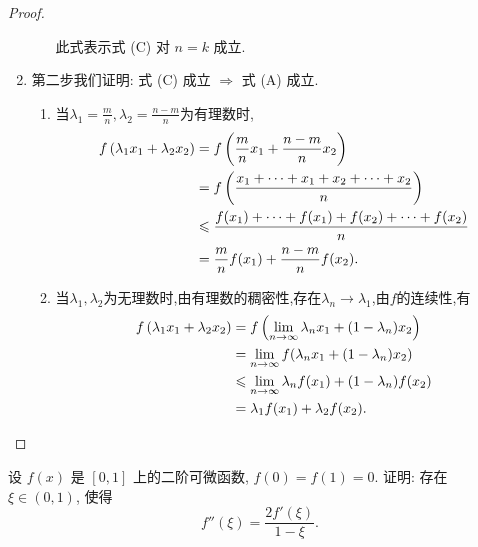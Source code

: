 \begin{proof}
\begin{enumerate}
\begin{enumerate}
                        此式表示式 (C) 对 $n = k$ 成立.
              \end{enumerate}
        \item 第二步我们证明:
              式 (C) 成立 $\Rightarrow$ 式 (A) 成立.

              \begin{enumerate}
                  \item 当$\lambda_1 =\frac{m}{n},\lambda_2 = \frac{n-m}{n}$为有理数时,
                        \begin{align*}
                            f\left(\lambda_1 x_1 + \lambda_2 x_2\right) & = f\left(\frac{m}{n}x_1 + \frac{n-m}{n}x_2\right)                \\
                                                                        & = f\left(\frac{x_1 + \cdots + x_1 + x_2 + \cdots + x_2}n\right)  \\
                                                                        & \leqslant \frac{f(x_1) + \cdots + f(x_1) + f(x_2) + \cdots + f(x_2)}n \\
                                                                        & = \frac{m}{n}f(x_1) + \frac{n-m}{n}f(x_2).
                        \end{align*}
                  \item 当$\lambda_1,\lambda_2$为无理数时,由有理数的稠密性,存在$\lambda_n \to \lambda_1$,由$f$的连续性,有
                        \begin{align*}
                            f\left(\lambda_1 x_1 + \lambda_2 x_2\right) & = f\left(\lim_{n \to \infty} \lambda_n x_1 + (1-\lambda_n) x_2\right) \\
                                                                        & = \lim_{n \to \infty} f(\lambda_n x_1 + (1-\lambda_n) x_2)            \\
                                                                        & \leqslant \lim_{n \to \infty} \lambda_n f(x_1) + (1-\lambda_n)f(x_2)       \\
                                                                        & = \lambda_1 f(x_1) + \lambda_2 f(x_2).
                        \end{align*}
              \end{enumerate}
    \end{enumerate}
\end{proof}

\begin{exercise}[3.C.6]
    设 $f(x)$ 是 $[0, 1]$ 上的二阶可微函数, $f(0) = f(1) = 0$. 证明: 存在 $\xi \in (0, 1)$, 使得
    $$f''(\xi) = \frac{2 f'(\xi)}{1 - \xi}.$$
\end{exercise}

